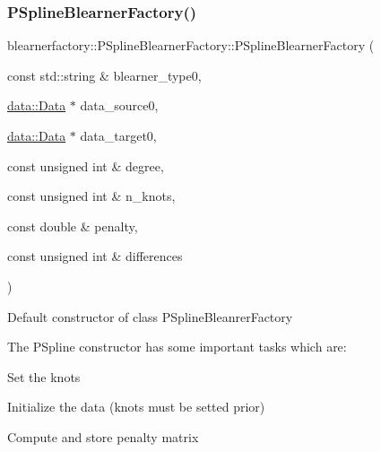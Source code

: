 \subsubsection{\texorpdfstring{P\+Spline\+Blearner\+Factory()}{PSplineBlearnerFactory()}}
{\footnotesize\ttfamily blearnerfactory\+::\+P\+Spline\+Blearner\+Factory\+::\+P\+Spline\+Blearner\+Factory (\begin{DoxyParamCaption}\item[{const std\+::string \&}]{blearner\+\_\+type0,  }\item[{\mbox{\hyperlink{classdata_1_1_data}{data\+::\+Data}} $\ast$}]{data\+\_\+source0,  }\item[{\mbox{\hyperlink{classdata_1_1_data}{data\+::\+Data}} $\ast$}]{data\+\_\+target0,  }\item[{const unsigned int \&}]{degree,  }\item[{const unsigned int \&}]{n\+\_\+knots,  }\item[{const double \&}]{penalty,  }\item[{const unsigned int \&}]{differences }\end{DoxyParamCaption})}



Default constructor of class {\ttfamily P\+Spline\+Bleanrer\+Factory} 

The P\+Spline constructor has some important tasks which are\+:
\begin{DoxyItemize}
\item Set the knots
\item Initialize the data (knots must be setted prior)
\item Compute and store penalty matrix
\end{DoxyItemize}


